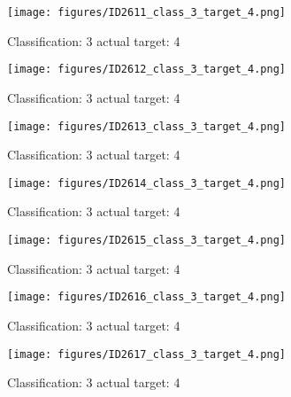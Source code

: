\begin{figure}[h!]
\begin{center}
\texttt{[image: figures/ID2611\_class\_3\_target\_4.png]}
\end{center}
\caption{ Classification: 3 actual target: 4}
\label{fig:ID2611_class_3_target_4}
\end{figure}
\begin{figure}[h!]
\begin{center}
\texttt{[image: figures/ID2612\_class\_3\_target\_4.png]}
\end{center}
\caption{ Classification: 3 actual target: 4}
\label{fig:ID2612_class_3_target_4}
\end{figure}
\begin{figure}[h!]
\begin{center}
\texttt{[image: figures/ID2613\_class\_3\_target\_4.png]}
\end{center}
\caption{ Classification: 3 actual target: 4}
\label{fig:ID2613_class_3_target_4}
\end{figure}
\begin{figure}[h!]
\begin{center}
\texttt{[image: figures/ID2614\_class\_3\_target\_4.png]}
\end{center}
\caption{ Classification: 3 actual target: 4}
\label{fig:ID2614_class_3_target_4}
\end{figure}
\begin{figure}[h!]
\begin{center}
\texttt{[image: figures/ID2615\_class\_3\_target\_4.png]}
\end{center}
\caption{ Classification: 3 actual target: 4}
\label{fig:ID2615_class_3_target_4}
\end{figure}
\begin{figure}[h!]
\begin{center}
\texttt{[image: figures/ID2616\_class\_3\_target\_4.png]}
\end{center}
\caption{ Classification: 3 actual target: 4}
\label{fig:ID2616_class_3_target_4}
\end{figure}
\begin{figure}[h!]
\begin{center}
\texttt{[image: figures/ID2617\_class\_3\_target\_4.png]}
\end{center}
\caption{ Classification: 3 actual target: 4}
\label{fig:ID2617_class_3_target_4}
\end{figure}
